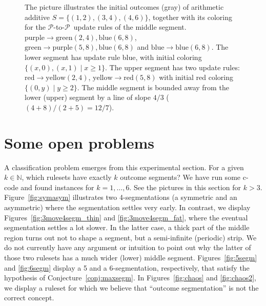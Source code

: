 \documentclass{amsart}
\theoremstyle{plain}
\theoremstyle{definition}
\renewcommand{\P}{\ensuremath{\mathcal P}}
\newcommand{\n}{\mathbb N}
\renewcommand{\ge}{\geqslant}
\begin{document}
\begin{figure}[htp!]
\begin{center}
\begin{tikzpicture}[scale = 0.22]
\end{tikzpicture}
\end{center}
\caption{The picture illustrates the initial  outcomes (gray) of {\sc arithmetic additive}  $S =\{(1,2),(3,4),(4,6)\}$, together with its coloring for the \P-to-\P\ update rules of the middle segment. $\mathrm{purple}\rightarrow \mathrm{green}(2,4),\mathrm{blue}(6,8)$, $\mathrm{green}\rightarrow \mathrm{ purple}(5,8),\mathrm{blue}(6,8)$ and $\mathrm{blue}\rightarrow \mathrm{blue}(6,8)$. The lower segment has update rule {\rm blue}, with initial coloring $\{(x,0),(x,1)\mid x\ge 1\}$. The upper segment has two update rules: $\mathrm{red}\rightarrow\mathrm{yellow}(2,4)$, $\mathrm{yellow}\rightarrow\mathrm{red}(5,8)$ with initial red coloring $\{(0,y)\mid y\ge 2\}$. The middle segment is bounded away from the lower (upper) segment by a line of slope $4/3$ ($(4+8)/(2+5)=12/7$).}
\label{fig:coloring123446}
\end{figure}

\section{Some open problems}
\label{sec:picopen}
A classification problem emerges from this experimental section. For a given $k\in \n$, which rulesets have exactly $k$ outcome segments? We have run some c-code and found instances for $k=1,\ldots ,6$. See the pictures in this section for $k>3$. Figure~\ref{fig:symasym} illustrates two 4-segmentations (a symmetric and an asymmetric) where the segmentation settles very early. In contrast, we display Figures~\ref{fig:3move4segm_thin} and \ref{fig:3move4segm_fat}, where the eventual segmentation settles a lot slower. In the latter case, a thick part of the middle region turns out not to shape a segment, but a semi-infinite (periodic) strip. We do not currently have any argument or intuition to point out why the latter of those two rulesets has a much wider (lower) middle segment.    Figures~\ref{fig:5segm} and \ref{fig:6segm} display a 5 and a 6-segmentation, respectively, that satisfy the hypothesis of Conjecture~\ref{conj:maxsegm}.  In Figures~\ref{fig:chaos} and \ref{fig:chaos2}, we display a ruleset for which we believe that ``outcome segmentation'' is not the correct concept.
\end{document}
